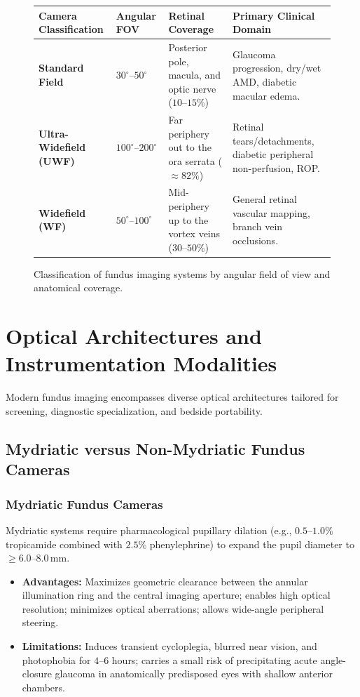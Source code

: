 \documentclass[11pt,a4paper]{article}
\begin{document}
\begin{figure}[htbp]
\centering
\setlength{\tabcolsep}{4pt}
\begin{tabular}{p{3.2cm}p{2.8cm}p{4.2cm}p{4.5cm}}
\toprule
\textbf{Camera Classification} & \textbf{Angular FOV} & \textbf{Retinal Coverage} & \textbf{Primary Clinical Domain} \\
\midrule
\textbf{Standard Field} & $30^\circ\text{--}50^\circ$ & Posterior pole, macula, and optic nerve ($10\text{--}15\%$) & Glaucoma progression, dry/wet AMD, diabetic macular edema. \\
\addlinespace
\textbf{Ultra-Widefield (UWF)} & $100^\circ\text{--}200^\circ$ & Far periphery out to the ora serrata ($\approx 82\%$) & Retinal tears/detachments, diabetic peripheral non-perfusion, ROP. \\
\addlinespace
\textbf{Widefield (WF)} & $50^\circ\text{--}100^\circ$ & Mid-periphery up to the vortex veins ($30\text{--}50\%$) & General retinal vascular mapping, branch vein occlusions. \\
\bottomrule
\end{tabular}
\caption{Classification of fundus imaging systems by angular field of view and anatomical coverage.}
\label{tab:fov_comparison}
\end{figure}

\section{Optical Architectures and Instrumentation Modalities}

Modern fundus imaging encompasses diverse optical architectures tailored for screening, diagnostic specialization, and bedside portability.

\subsection{Mydriatic versus Non-Mydriatic Fundus Cameras}

\subsubsection{Mydriatic Fundus Cameras}
Mydriatic systems require pharmacological pupillary dilation (e.g., $0.5\text{--}1.0\%$ tropicamide combined with $2.5\%$ phenylephrine) to expand the pupil diameter to $\ge 6.0\text{--}8.0\,\text{mm}$.
\begin{itemize}[leftmargin=*]
    \item \textbf{Advantages:} Maximizes geometric clearance between the annular illumination ring and the central imaging aperture; enables high optical resolution; minimizes optical aberrations; allows wide-angle peripheral steering.
    \item \textbf{Limitations:} Induces transient cycloplegia, blurred near vision, and photophobia for $4\text{--}6$ hours; carries a small risk of precipitating acute angle-closure glaucoma in anatomically predisposed eyes with shallow anterior chambers.
\end{itemize}
\end{document}
